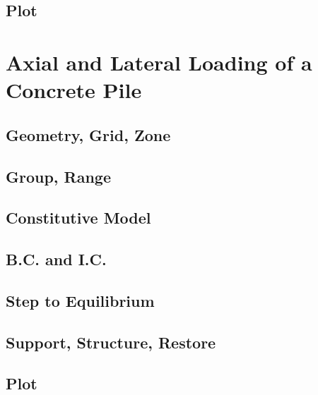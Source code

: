 \documentclass[a4paper, nobind]{templates/ociamthesis}
\begin{document}
\hypertarget{plot-1}{%
\section{Plot}\label{plot-1}}

\hypertarget{axial-and-lateral-loading-of-a-concrete-pile}{%
\chapter{Axial and Lateral Loading of a Concrete Pile}\label{axial-and-lateral-loading-of-a-concrete-pile}}

\hypertarget{geometry-grid-zone-2}{%
\section{Geometry, Grid, Zone}\label{geometry-grid-zone-2}}

\hypertarget{group-range-2}{%
\section{Group, Range}\label{group-range-2}}

\hypertarget{constitutive-model-2}{%
\section{Constitutive Model}\label{constitutive-model-2}}

\hypertarget{b.c.-and-i.c.-2}{%
\section{B.C. and I.C.}\label{b.c.-and-i.c.-2}}

\hypertarget{step-to-equilibrium-2}{%
\section{Step to Equilibrium}\label{step-to-equilibrium-2}}

\hypertarget{support-structure-restore-2}{%
\section{Support, Structure, Restore}\label{support-structure-restore-2}}

\hypertarget{plot-2}{%
\section{Plot}\label{plot-2}}
\end{document}
